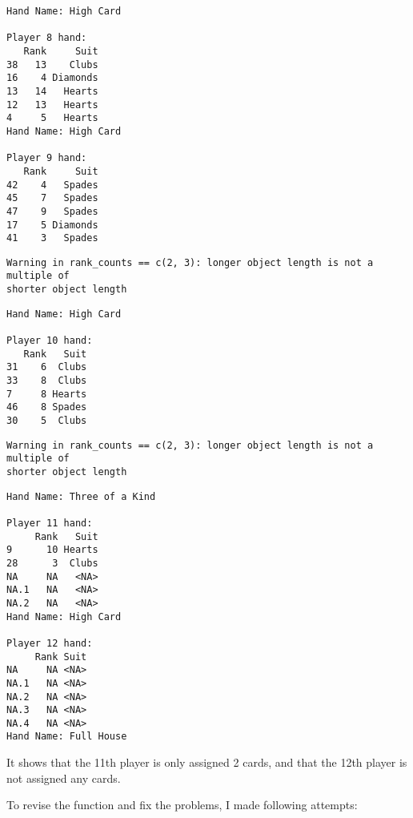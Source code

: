 \documentclass[
  letterpaper,
  DIV=11,
  numbers=noendperiod]{scrartcl}
\begin{document}
\begin{verbatim}
Hand Name: High Card 

Player 8 hand: 
   Rank     Suit
38   13    Clubs
16    4 Diamonds
13   14   Hearts
12   13   Hearts
4     5   Hearts
Hand Name: High Card 

Player 9 hand: 
   Rank     Suit
42    4   Spades
45    7   Spades
47    9   Spades
17    5 Diamonds
41    3   Spades
\end{verbatim}

\begin{verbatim}
Warning in rank_counts == c(2, 3): longer object length is not a multiple of
shorter object length
\end{verbatim}

\begin{verbatim}
Hand Name: High Card 

Player 10 hand: 
   Rank   Suit
31    6  Clubs
33    8  Clubs
7     8 Hearts
46    8 Spades
30    5  Clubs
\end{verbatim}

\begin{verbatim}
Warning in rank_counts == c(2, 3): longer object length is not a multiple of
shorter object length
\end{verbatim}

\begin{verbatim}
Hand Name: Three of a Kind 

Player 11 hand: 
     Rank   Suit
9      10 Hearts
28      3  Clubs
NA     NA   <NA>
NA.1   NA   <NA>
NA.2   NA   <NA>
Hand Name: High Card 

Player 12 hand: 
     Rank Suit
NA     NA <NA>
NA.1   NA <NA>
NA.2   NA <NA>
NA.3   NA <NA>
NA.4   NA <NA>
Hand Name: Full House 
\end{verbatim}

It shows that the 11th player is only assigned 2 cards, and that the
12th player is not assigned any cards.

To revise the function and fix the problems, I made following attempts:
\end{document}
